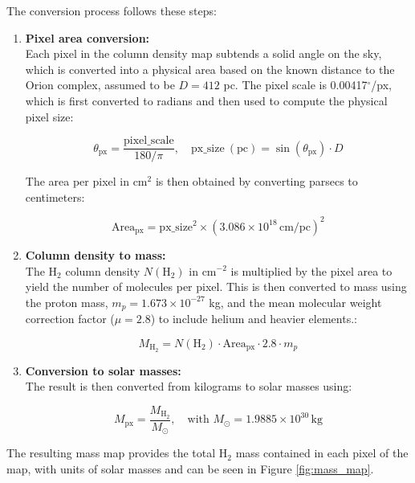 The conversion process follows these steps:

\begin{enumerate}
    \item \textbf{Pixel area conversion:} \\
    Each pixel in the column density map subtends a solid angle on the sky, which is converted into a physical area based on the known distance to the Orion complex, assumed to be $D = 412$ pc. The pixel scale is 0.00417$^\circ$/px, which is first converted to radians and then used to compute the physical pixel size:

    \[
    \theta_{\mathrm{px}} = \frac{\mathrm{pixel\_scale}}{180/\pi}, \quad 
    \mathrm{px\_size\ (pc)} = \sin(\theta_{\mathrm{px}}) \cdot D
    \]

    The area per pixel in cm$^2$ is then obtained by converting parsecs to centimeters:

    \[
    \mathrm{Area_{px}} = \mathrm{px\_size}^2 \times (3.086 \times 10^{18}\,\mathrm{cm/pc})^2
    \]

    \item \textbf{Column density to mass:} \\
    The H$_2$ column density $N(\mathrm{H}_2)$ in cm$^{-2}$ is multiplied by the pixel area to yield the number of molecules per pixel. This is then converted to mass using the proton mass, $m_p = 1.673 \times 10^{-27}$ kg, and the mean molecular weight correction factor ($\mu = 2.8$) to include helium and heavier elements.:

    \[
    M_{\mathrm{H}_2} = N(\mathrm{H}_2) \cdot \mathrm{Area_{px}} \cdot 2.8 \cdot m_p
    \]

    \item \textbf{Conversion to solar masses:} \\
    The result is then converted from kilograms to solar masses using:

    \[
    M_{\mathrm{px}} = \frac{M_{\mathrm{H}_2}}{M_\odot}, \quad \text{with } M_\odot = 1.9885 \times 10^{30}\, \mathrm{kg}
    \]
\end{enumerate}

The resulting mass map provides the total H$_2$ mass contained in each pixel of the map, with units of solar masses and can be seen in Figure \ref{fig:mass_map}.

